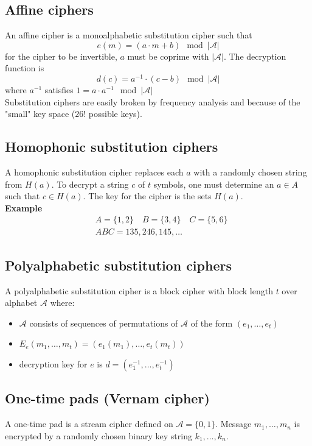 \documentclass[12pt, a4paper]{report}
\begin{document}
\subsection{Affine ciphers}
An affine cipher is a monoalphabetic substitution cipher  such that
\begin{equation*}
    e(m) = (a\cdot m+b)\mod |\mathcal{A}|
\end{equation*}
for the cipher to be invertible, $a$ must be coprime with $|\mathcal{A}|$. The decryption function is
\begin{equation*}
    d(c) = a^{-1}\cdot (c-b)\mod |\mathcal{A}|
\end{equation*}
where $a^{-1}$  satisfies $1 = a\cdot a^{-1}\mod |\mathcal{A}|$\\
Substitution ciphers are easily broken by frequency analysis and because of the "small" key space ($26!$ possible keys).
\subsection{Homophonic substitution ciphers}
A homophonic substitution cipher replaces each $a$ with a randomly chosen string from $H(a)$. To decrypt a string $c$ of $t$ symbols, one must determine an $a\in A$ such that $c\in H(a)$. The key for the cipher is the sets $H(a)$.\\
\textbf{Example}
\begin{equation*}
    \begin{split}
        &A = \{1,2\}\quad B = \{3,4\} \quad C = \{5,6\}\\
        &ABC = 135, 246, 145, \ldots
    \end{split}
\end{equation*}
\subsection{Polyalphabetic substitution ciphers}
A polyalphabetic substitution cipher is a block cipher with block length $t$ over alphabet $\mathcal{A}$ where:
\begin{itemize}
    \item $\mathcal{A}$ consists of sequences of permutations of $\mathcal{A}$ of the form $(e_{1},\ldots,e_{t})$
    \item $E_{e}(m_{1},\ldots,m_{t}) = (e_{1}(m_{1}),\ldots,e_{t}(m_{t}))$
    \item decryption key for $e$ is $d = (e_{1}^{-1},\ldots,e_{t}^{-1})$
\end{itemize}
\subsection{One-time pads (Vernam cipher)}
A one-time pad is a stream cipher defined on $\mathcal{A}=\{0,1\}$. Message $m_{1},\ldots,m_{n}$ is encrypted by a randomly chosen binary key string $k_{1},\ldots,k_{n}$.
\end{document}

